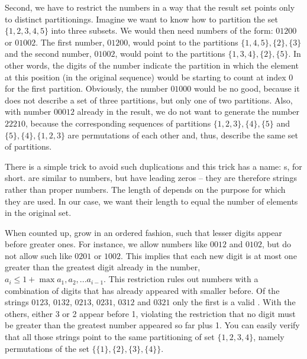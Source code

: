 \documentclass{scrreprt}
\begin{document}
Second, we have to restrict the numbers in a way
that the result set points only to distinct partitionings.
Imagine we want to know how to partition 
the set $\lbrace 1,2,3,4,5\rbrace$ into three subsets.
We would then need numbers of the form:
$01200$ or $01002$.
The first number, $01200$, would point to the partitions
$\lbrace 1,4,5\rbrace, \lbrace 2\rbrace, \lbrace 3\rbrace$ and
the second number, $01002$, would point to the partitions
$\lbrace 1,3,4\rbrace, \lbrace 2\rbrace, \lbrace 5\rbrace$.
In other words, the digits of the number indicate
the partition in which the element at this position
(in the original sequence) would be starting to count at
index 0 for the first partition.
Obviously, the number $01000$ would be no good,
because it does not describe a set of three partitions,
but only one of two partitions.
Also, with number $00012$ already in the result,
we do not want to generate the number $22210$,
because the corresponding sequences of partitions
$\lbrace 1,2,3\rbrace, \lbrace 4\rbrace, \lbrace 5\rbrace$ and
$\lbrace 5\rbrace, \lbrace 4\rbrace, \lbrace 1,2,3\rbrace$ 
are permutations of each other and, thus, describe 
the same set of partitions.

There is a simple trick to avoid such duplications
and this trick has a name: s,
 for short.
 are similar to numbers, but have leading zeros --
they are therefore strings rather than proper numbers.
The length of  depends on the purpose
for which they are used. In our case,
we want their length to equal the number of elements
in the original set.

When counted up,  grow in an ordered fashion,
such that lesser digits appear before greater ones.
For instance, we allow numbers like $0012$ and $0102$,
but do not allow such like $0201$ or $1002$.
This implies that each new digit is at most one greater
than the greatest digit already in the number, \ie\
$a_i \le 1 + \max{a_1,a_2,...a_{i-1}}$.
This restriction rules out numbers with a combination of digits
that has already appeared with smaller  before.
Of the strings
$0123$, $0132$, $0213$, $0231$, $0312$ and $0321$
only the first is a valid .
With the others, either 3 or 2 appear
before 1, violating the restriction that no digit
must be greater than the greatest number appeared so far
plus 1. You can easily verify that
all those strings point to the same partitioning
of set $\lbrace 1,2,3,4\rbrace$, namely permutations
of the set
$\lbrace\lbrace 1\rbrace,
        \lbrace 2\rbrace,
        \lbrace 3\rbrace,
        \lbrace 4\rbrace\rbrace$.
\end{document}
